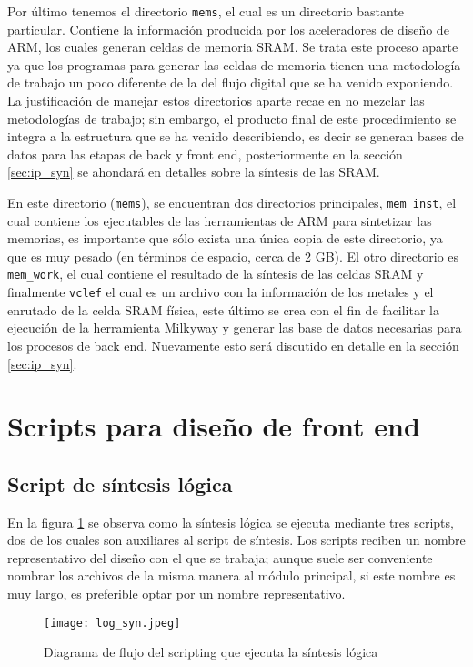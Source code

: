 Por último tenemos el directorio \texttt{mems}, el cual es un directorio bastante particular. Contiene la información producida por los aceleradores de diseño de ARM, los cuales generan celdas de memoria SRAM. Se trata este proceso aparte ya que los programas para generar las celdas de memoria tienen una metodología de trabajo un poco diferente de la del flujo digital que se ha venido exponiendo. La justificación de manejar estos directorios aparte recae en no mezclar las metodologías de trabajo; sin embargo, el producto final de este procedimiento se integra a la estructura que se ha venido describiendo, es decir se generan bases de datos para las etapas de back y front end, posteriormente en la sección \ref{sec:ip_syn} se ahondará en detalles sobre la síntesis de las SRAM.

En este directorio (\texttt{mems}), se encuentran dos directorios principales, \texttt{mem\_inst}, el cual contiene los ejecutables de las herramientas de ARM para sintetizar las memorias, es importante que sólo exista una única copia de este directorio, ya que es muy pesado (en términos de espacio, cerca de 2 GB). El otro directorio es \texttt{mem\_work}, el cual contiene el resultado de la síntesis de las celdas SRAM y finalmente \texttt{vclef} el cual es un archivo con la información de los metales y el enrutado de la celda SRAM física, este último se crea con el fin de facilitar la ejecución de la herramienta Milkyway y generar las base de datos necesarias para los procesos de back end. Nuevamente esto será discutido en detalle en la sección \ref{sec:ip_syn}.



\section{Scripts para diseño de front end}
\label{sec:syn_s}
\subsection{Script de síntesis lógica}
\label{script_syn}
En la figura \ref{s_syn} se observa como la síntesis lógica se ejecuta mediante tres scripts, dos de los cuales son auxiliares al script de síntesis. Los scripts reciben un nombre representativo del diseño con el que se trabaja; aunque suele ser conveniente nombrar los archivos de la misma manera al módulo principal, si este nombre es muy largo, es preferible optar por un nombre representativo.

\begin{figure}[h]
\texttt{[image: log\_syn.jpeg]}
\centering
\caption{Diagrama de flujo del scripting que ejecuta la síntesis lógica}
\label{s_syn}
\end{figure}

